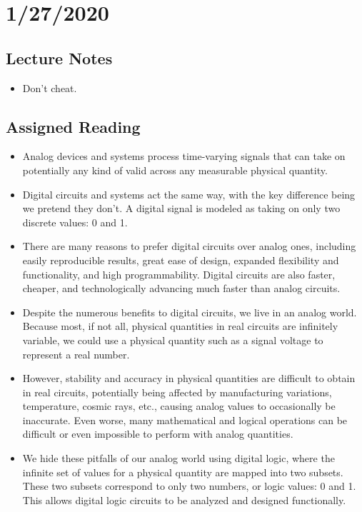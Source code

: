 \documentclass[10pt,a4paper]{article}
\author{Ben Miller}
\begin{document}
\tableofcontents
\pagebreak
\section{1/27/2020}
\subsection{Lecture Notes}
\begin{itemize}
\item Don't cheat. 
\end{itemize}
\subsection{Assigned Reading}
\begin{itemize}
\item Analog devices and systems process time-varying signals that can take on potentially any kind of valid across any measurable physical quantity. 
\item Digital circuits and systems act the same way, with the key difference being we pretend they don't. A digital signal is modeled as taking on only two discrete values: 0 and 1. 
\item There are many reasons to prefer digital circuits over analog ones, including easily reproducible results, great ease of design, expanded flexibility and functionality, and high programmability. Digital circuits are also faster, cheaper, and technologically advancing much faster than analog circuits. 
\item Despite the numerous benefits to digital circuits, we live in an analog world. Because most, if not all, physical quantities in real circuits are infinitely variable, we could use a physical quantity such as a signal voltage to represent a real number. 
\item However, stability and accuracy in physical quantities are difficult to obtain in real circuits, potentially being affected by manufacturing variations, temperature, cosmic rays, etc., causing analog values to occasionally be inaccurate. Even worse, many mathematical and logical operations can be difficult or even impossible to perform with analog quantities. 
\item We hide these pitfalls of our analog world using digital logic, where the infinite set of values for a physical quantity are mapped into two subsets. These two subsets correspond to only two numbers, or logic values: 0 and 1. This allows digital logic circuits to be analyzed and designed functionally. 

\end{itemize}
\end{document}
